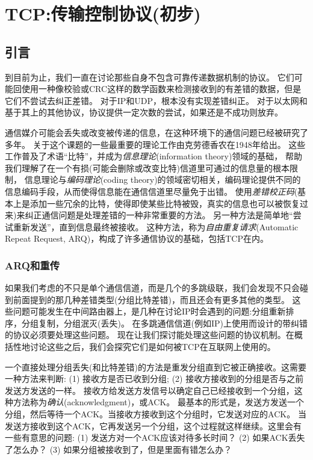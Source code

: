 \documentclass{../main.tex}{subfiles}
\begin{document}
\chapter{TCP:传输控制协议(初步)}
\section{引言}
到目前为止，我们一直在讨论那些自身不包含可靠传递数据机制的协议。
它们可能回使用一种像校验或CRC这样的数学函数来检测接收到的有差错的数据，但是它们不尝试去纠正差错。
对于IP和UDP，根本没有实现差错纠正。
对于以太网和基于其上的其他协议，协议提供一定次数的尝试，如果还是不成功则放弃。

通信媒介可能会丢失或改变被传递的信息，在这种环境下的通信问题已经被研究了多年。
关于这个课题的一些最重要的理论工作由克劳德\textperiodcentered 香农在1948年给出\cite{Shannon1948A}。
这些工作普及了术语``比特''，并成为\emph{信息理论}(information theory)领域的基础，
    帮助我们理解了在一个有损(可能会删除或改变比特)信道里可通过的信息量的根本限制，
信息理论与\emph{编码理论}(coding theory)的领域密切相关，编码理论提供不同的信息编码手段，从而使得信息能在通信信道里尽量免于出错。
使用\emph{差错校正码}(基本上是添加一些冗余的比特，使得即使某些比特被毁，真实的信息也可以被恢复过来)来纠正通信问题是处理差错的一种非常重要的方法。
另一种方法是简单地``尝试重新发送''，直到信息最终被接收。
这种方法，称为\emph{自由重复请求}(Automatic Repeat Request, ARQ)，构成了许多通信协议的基础，包括TCP在内。


\subsection{ARQ和重传}
如果我们考虑的不只是单个通信信道，而是几个的多跳级联，我们会发现不只会碰到前面提到的那几种差错类型(分组比特差错)，而且还会有更多其他的类型。
这些问题可能发生在中间路由器上，是几种在讨论IP时会遇到的问题:分组重新排序，分组复制，分组泯灭(丢失)。
在多跳通信信道(例如IP)上使用而设计的带纠错的协议必须要处理这些问题。
现在让我们探讨能处理这些问题的协议机制。在概括性地讨论这些之后，我们会探究它们是如何被TCP在互联网上使用的。

% 
一个直接处理分组丢失(和比特差错)的方法是重发分组直到它被正确接收。这需要一种方法来判断: 
(1) 接收方是否已收到分组; (2) 接收方接收到的分组是否与之前发送方发送的一样。
接收方给发送方发信号以确定自己已经接收到一个分组，这种方法称为\emph{确认}(acknowledgment)，或ACK。
最基本的形式是，发送方发送一个分组，然后等待一个ACK。当接收方接收到这个分组时，它发送对应的ACK。
当发送方接收到这个ACK，它再发送另一个分组，这个过程就这样继续。这里会有一些有意思的问题:
(1) 发送方对一个ACK应该对待多长时间？ (2) 如果ACK丢失了怎么办？ (3) 如果分组被接收到了，但是里面有错怎么办？
\end{document}
